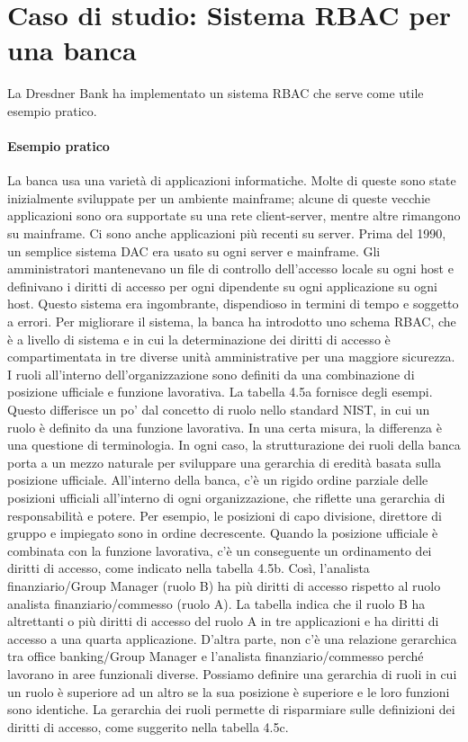 \newpage
\section{Caso di studio: Sistema RBAC per una banca}

La Dresdner Bank ha implementato un sistema RBAC che serve come utile esempio pratico.

\paragraph{Esempio pratico} La banca usa una varietà di applicazioni informatiche. Molte di queste sono state inizialmente sviluppate per un ambiente mainframe; alcune di queste vecchie applicazioni sono ora supportate su una rete client-server, mentre altre rimangono su mainframe. Ci sono anche applicazioni più recenti su server. Prima del 1990, un semplice sistema DAC era usato su ogni server e mainframe. Gli amministratori mantenevano un file di controllo dell'accesso locale su ogni host e definivano i diritti di accesso per ogni dipendente su ogni applicazione su ogni host. Questo sistema era ingombrante, dispendioso in termini di tempo e soggetto a errori. Per migliorare il sistema, la banca ha introdotto uno schema RBAC, che è a livello di sistema e in cui la determinazione dei diritti di accesso è compartimentata in tre diverse unità amministrative per una maggiore sicurezza. I ruoli all'interno dell'organizzazione sono definiti da una combinazione di posizione ufficiale e funzione lavorativa. La tabella 4.5a fornisce degli esempi. Questo differisce un po' dal concetto di ruolo nello standard NIST, in cui un ruolo è definito da una funzione lavorativa. In una certa misura, la differenza è una questione di terminologia. In ogni caso, la strutturazione dei ruoli della banca porta a un mezzo naturale per sviluppare una gerarchia di eredità basata sulla posizione ufficiale. All'interno della banca, c'è un rigido ordine parziale delle posizioni ufficiali all'interno di ogni organizzazione, che riflette una gerarchia di responsabilità e potere. Per esempio, le posizioni di capo divisione, direttore di gruppo e impiegato sono in ordine decrescente. Quando la posizione ufficiale è combinata con la funzione lavorativa, c'è un conseguente un ordinamento dei diritti di accesso, come indicato nella tabella 4.5b. Così, l'analista finanziario/Group Manager (ruolo B) ha più diritti di accesso rispetto al ruolo analista finanziario/commesso (ruolo A). La tabella indica che il ruolo B ha altrettanti o più diritti di accesso del ruolo A in tre applicazioni e ha diritti di accesso a una quarta applicazione. D'altra parte, non c'è una relazione gerarchica tra office banking/Group Manager e l'analista finanziario/commesso perché lavorano in aree funzionali diverse. Possiamo definire una gerarchia di ruoli in cui un ruolo è superiore ad un altro se la sua posizione è superiore e le loro funzioni sono identiche. La gerarchia dei ruoli permette di risparmiare sulle definizioni dei diritti di accesso, come suggerito nella tabella 4.5c.

